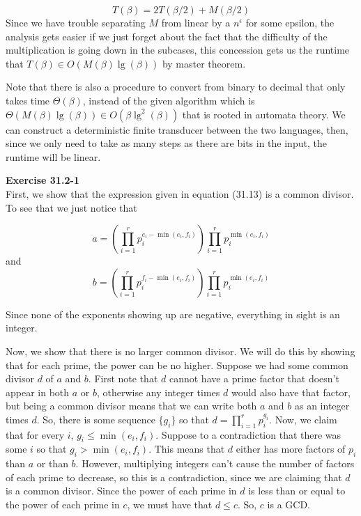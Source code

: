 \documentclass{article}
\begin{document}
\[
T( \beta) = 2T(\beta/2) + M(\beta/2)
\]
Since we have trouble separating $M$ from linear by a $n^{\epsilon}$ for some epsilon, the analysis gets easier if we just forget about the fact that the difficulty of the multiplication is going down in the subcases, this concession gets us the runtime that $T(\beta) \in O(M(\beta) \lg(\beta))$ by master theorem.

Note that there is also a procedure to convert from binary to decimal that only takes time $\Theta(\beta)$, instead of the given algorithm which is $\Theta(M(\beta)\lg(\beta)) \in O(\beta \lg^2(\beta))$ that is rooted in automata theory. We can construct a deterministic finite transducer between the two languages, then, since we only need to take as many steps as there are bits in the input, the runtime will be linear. 



\noindent\textbf{Exercise 31.2-1}\\

First, we show that the expression given in equation (31.13) is a common divisor. To see that we just notice that 

\[
a = (\prod_{i=1}^r p_i^{e_i-\min(e_i,f_i)})\prod_{i=1}^r p_i^{\min(e_i,f_i)}
\]
and 
\[
b = (\prod_{i=1}^r p_i^{f_i-\min(e_i,f_i)})\prod_{i=1}^r p_i^{\min(e_i,f_i)}
\]

Since none of the exponents showing up are negative, everything in sight is an integer.

Now, we show that there is no larger common divisor. We will do this by showing that for each prime, the power can be no higher. Suppose we had some common divisor $d$ of $a$ and $b$. First note that $d$ cannot have a prime factor that doesn't appear in both $a$ or $b$, otherwise any integer times $d$ would also have that factor, but being a common divisor means that we can write both $a$ and $b$ as an integer times $d$. So, there is some sequence $\{g_i\}$ so that $d = \prod_{i=1}^r p_i^{g_i}$. Now, we claim that for every $i$, $g_i \le \min(e_i,f_i)$. Suppose to a contradiction that there was some $i$ so that $g_i>\min(e_i,f_i)$. This means that $d$ either has more factors of $p_i$ than $a$ or than $b$. However, multiplying integers can't cause the number of factors of each prime to decrease, so this is a contradiction, since we are claiming that $d$ is a common divisor. Since the power of each prime in $d$ is less than or equal to the power of each prime in $c$, we must have that $d\le c$. So, $c$ is a GCD.
\end{document}
